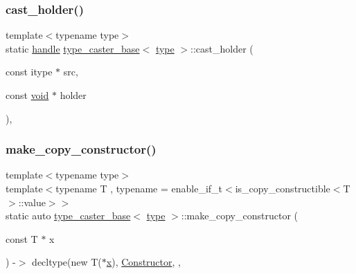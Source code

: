 \mbox{\label{classtype__caster__base_a0754eb4fb420f51d5e38a99c9b2e725e}} 
\subsubsection{\texorpdfstring{cast\_holder()}{cast\_holder()}}
{\footnotesize\ttfamily template$<$typename type$>$ \\
static \mbox{\hyperlink{classhandle}{handle}} \mbox{\hyperlink{classtype__caster__base}{type\+\_\+caster\+\_\+base}}$<$ \mbox{\hyperlink{_s_d_l__opengl_8h_ad5ddf6fca7b585646515660e810e0188}{type}} $>$\+::cast\+\_\+holder (\begin{DoxyParamCaption}\item[{const itype $\ast$}]{src,  }\item[{const \mbox{\hyperlink{_s_d_l__opengles2__gl2ext_8h_ae5d8fa23ad07c48bb609509eae494c95}{void}} $\ast$}]{holder }\end{DoxyParamCaption})\hspace{0.3cm}{\ttfamily [inline]}, {\ttfamily [static]}}

\mbox{\label{classtype__caster__base_a369831bdda16afdc431102e26553aa66}} 
\subsubsection{\texorpdfstring{make\_copy\_constructor()}{make\_copy\_constructor()}\hspace{0.1cm}{\footnotesize\ttfamily [1/2]}}
{\footnotesize\ttfamily template$<$typename type$>$ \\
template$<$typename T , typename  = enable\+\_\+if\+\_\+t$<$is\+\_\+copy\+\_\+constructible$<$\+T$>$\+::value$>$$>$ \\
static auto \mbox{\hyperlink{classtype__caster__base}{type\+\_\+caster\+\_\+base}}$<$ \mbox{\hyperlink{_s_d_l__opengl_8h_ad5ddf6fca7b585646515660e810e0188}{type}} $>$\+::make\+\_\+copy\+\_\+constructor (\begin{DoxyParamCaption}\item[{const T $\ast$}]{x }\end{DoxyParamCaption}) -\/$>$ decltype(new T($\ast$\mbox{\hyperlink{_s_d_l__opengl_8h_ad0e63d0edcdbd3d79554076bf309fd47}{x}}), \mbox{\hyperlink{classtype__caster__base_ab5020d71e0fb1d9e827af0f280c575ac}{Constructor}}\hspace{0.3cm}{\ttfamily [inline]}, {\ttfamily [static]}, {\ttfamily [protected]}}

